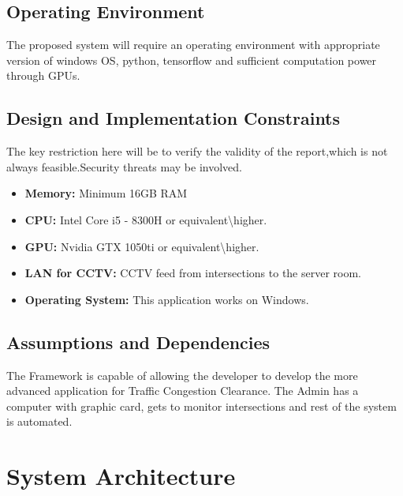\documentclass[openany,12pt]{report}
\begin{document}
	\subsection{Operating Environment}
	\hspace*{0.5in}The proposed system will require an operating environment with appropriate version of windows OS, python, tensorflow and sufficient computation power through GPUs.
	
	\subsection{Design and Implementation Constraints}
	\hspace*{0.5in}
	The key restriction here will be to verify the validity of the report,which is not always feasible.Security threats may be involved.\\
	\begin{itemize}
		\item{\textbf{Memory:} Minimum 16GB RAM}
		\item{\textbf{CPU:} Intel Core i5 - 8300H or equivalent\textbackslash higher.}\\
		\item{\textbf{GPU:} Nvidia GTX 1050ti or equivalent\textbackslash higher.}
		\item{\textbf{LAN for CCTV:}  CCTV feed from intersections to the server room.}
		\item{\textbf{Operating System:}  This application works on Windows.}
	\end{itemize}
	
	\subsection{Assumptions and Dependencies}
	\hspace*{0.5in}The Framework is capable of allowing the developer to develop the more advanced application for Traffic Congestion Clearance. The Admin has a
	computer with graphic card, gets to monitor intersections and rest of the system is automated.
	
	
	\newpage
	\section{System Architecture}
	
\end{document}
